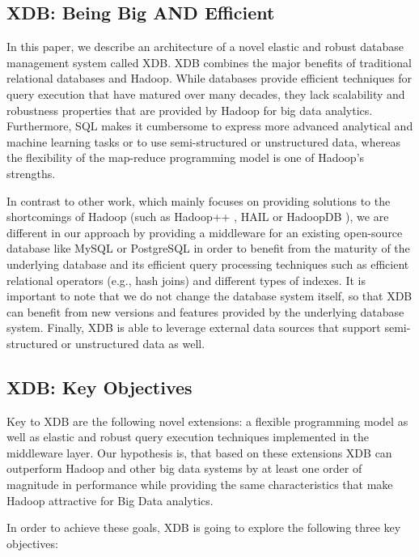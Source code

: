 \documentclass{sig-alternate}
\begin{document}
\subsection{XDB: Being Big AND Efficient }
\label{sec:intro:xdb}

In this paper, we describe an architecture of a novel elastic and robust database management system called XDB. XDB combines the major benefits of traditional relational databases and Hadoop. While databases provide efficient techniques for query execution that have matured over many decades, they lack scalability and robustness properties that are provided by Hadoop for big data analytics. Furthermore, SQL makes it cumbersome to express more advanced analytical and machine learning tasks or to use semi-structured or unstructured data, whereas the flexibility of the map-reduce programming model is one of Hadoop's strengths.
	
In contrast to other work, which mainly focuses on providing solutions to the shortcomings of Hadoop (such as Hadoop++ \cite{HadoopPP:PVLDB:2010}, HAIL \cite{HAIL:PVLDB:2012} or HadoopDB \cite{HadoopDB:SIGMOD:2010}), we are different in our approach by providing a middleware for an existing open-source database like MySQL or PostgreSQL in order to benefit from the maturity of the underlying database and its efficient query processing techniques such as efficient relational operators (e.g., hash joins) and different types of indexes. It is important to note that we do not change the database system itself, so that XDB can benefit from new versions and features provided by the underlying database system. Finally, XDB is able to leverage external data sources that support semi-structured or unstructured data as well. \\

\subsection{XDB: Key Objectives}
\label{sec:intro:obj}

Key to XDB are the following novel extensions: a flexible programming model as well as elastic and robust query execution techniques implemented in the middleware layer. Our hypothesis is, that based on these extensions XDB can outperform Hadoop and other big data systems by at least one order of magnitude in performance while providing the same characteristics that make Hadoop attractive for Big Data analytics. 

In order to achieve these goals, XDB is going to explore the following three key objectives: \\
\end{document}
